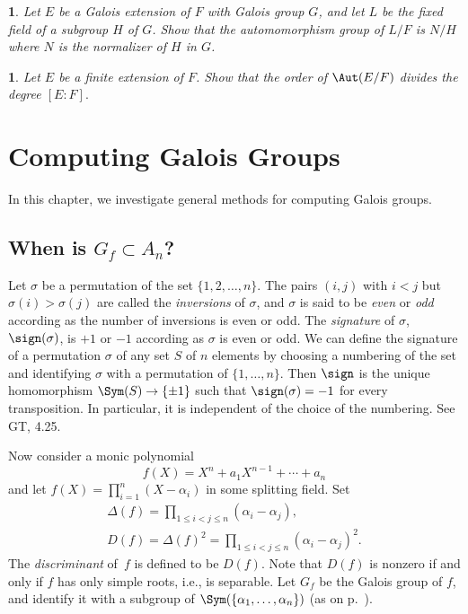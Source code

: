 \documentclass[a4paper,11pt,final,openany]{memoir}
\newtheorem{exercise}[Y]{}
\theoremstyle{nonumberplain}
\begin{document}
\begin{exercise}
\label{x13a}Let $E$ be a Galois extension of $F$ with Galois group $G$, and
let $L$ be the fixed field of a subgroup $H$ of $G$. Show that the
automomorphism group of $L/F$ is $N/H$ where $N$ is the normalizer of $H$ in
$G$.
\end{exercise}

\begin{exercise}
\label{x13b}Let $E$ be a finite extension of $F$. Show that the order of
$\Aut(E/F)$ divides the degree $[E\colon F].$
\end{exercise}

\clearpage


\chapter{Computing Galois Groups}

In this chapter, we investigate general methods for computing Galois groups.

\section{When is \texorpdfstring{$G_{f}\subset A_{n}$}{Gf in An}?}

Let $\sigma$ be a permutation of the set $\{1,2,\ldots,n\}$. The pairs $(i,j)$
with $i<j$ but $\sigma(i)>\sigma(j)$ are called the \emph{inversions} of
$\sigma$, and $\sigma$ is said to be \emph{even} or \emph{odd} according as
the number of inversions is even or odd. The \emph{signature} of $\sigma$,
$\sign(\sigma)$, is $+1$ or $-1$ according as $\sigma$ is even or odd. We can
define the signature of a permutation $\sigma$ of any set $S$ of $n$ elements
by choosing a numbering of the set and identifying $\sigma$ with a permutation
of $\{1,\ldots,n\}$. Then $\sign$ is the unique homomorphism
$\Sym(S)\rightarrow\{\pm1\}$ such that $\sign(\sigma)=-1$ for every
transposition. In particular, it is independent of the choice of the
numbering. See GT, 4.25.

Now consider a monic polynomial
\[
f(X)=X^{n}+a_{1}X^{n-1}+\cdots+a_{n}%
\]
and let $f(X)=\prod_{i=1}^{n}(X-\alpha_{i})$ in some splitting field. Set
\begin{gather*}
\Delta(f)=\prod_{1\leq i<j\leq n}(\alpha_{i}-\alpha_{j}),\\
 D(f)=\Delta
(f)^{2}=\prod_{1\leq i<j\leq n}(\alpha_{i}-\alpha_{j})^{2}.
\end{gather*}
The \emph{discriminant }%
%
of\emph{\ }$f$ is defined to be $D(f)$. Note that $D(f)$ is nonzero if and
only if $f$ has only simple roots, i.e., is separable. Let $G_{f}$ be the
Galois group of $f$, and identify it with a subgroup of $\Sym(\{\alpha
_{1},\ldots,\alpha_{n}\})$ (as on p.~\pageref{ggp}).
\end{document}
